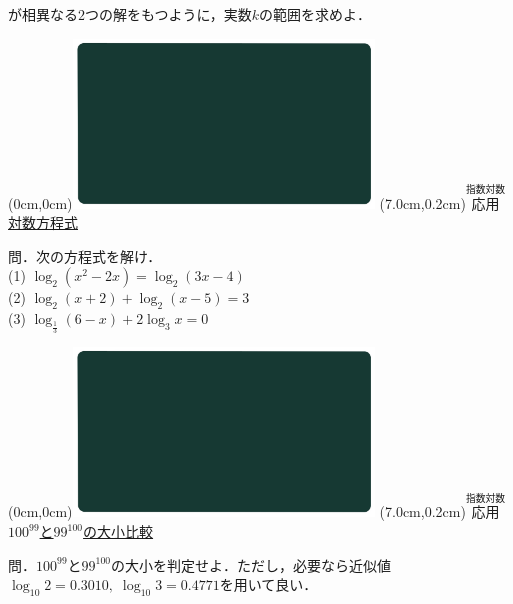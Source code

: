 \documentclass[10pt,
fleqn,
dvipdfmx,
uplatex
]{jsarticle}
\begin{document}
が相異なる$2$つの解をもつように，実数$k$の範囲を求めよ．


\newpage



\at(0cm,0cm){\includegraphics[width=8cm,bb=0 0 1920 1080]{./youtube/thumbnails/templates/smart_background/指数対数.jpeg}}
\at(7.0cm,0.2cm){\small\color{bradorange}$\overset{\text{指数対数}}{\text{応用}}$}
{\color{orange}\huge\underline{対数方程式}}\vspace{0.3zw}

\normalsize 
問．次の方程式を解け．\\
(1)  $\log _2\left(x^2-2x\right)=\log _2\left(3x-4\right)$\\
(2)  $\log _2\left(x+2\right)+\log _2\left(x-5\right)=3$\\
(3)  $\log _{\frac{1}{3}}\left(6-x\right)+2\log _3x=0$\\



\newpage



\at(0cm,0cm){\includegraphics[width=8cm,bb=0 0 1920 1080]{./youtube/thumbnails/templates/smart_background/指数対数.jpeg}}
\at(7.0cm,0.2cm){\small\color{bradorange}$\overset{\text{指数対数}}{\text{応用}}$}
{\color{orange}\LARGE\underline{$100^{99}$と$99^{100}$の大小比較}}\vspace{0.3zw}

\Large 
問．${100}^{99}$と${99}^{100}$の大小を判定せよ．ただし，必要なら近似値$\log _{{10}}2=0.{3010},\;\log _{{10}}3=0.{4771}$を用いて良い．


\newpage
\end{document}
